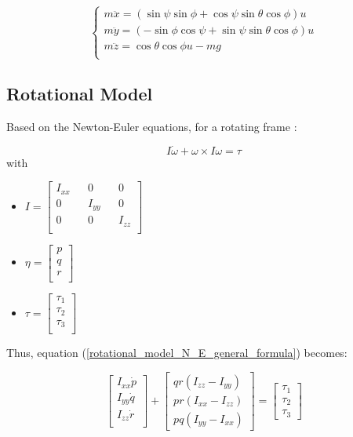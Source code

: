 \documentclass{thesisreport}
\begin{document}
\begin{equation}\label{translation_model_N_E}
\begin{cases}
m \ddot{x} = (\sin \psi \sin \phi + \cos \psi \sin \theta \cos \phi)u \\
m \ddot{y} = (- \sin \phi \cos \psi + \sin \psi \sin \theta \cos \phi )u \\
m \ddot{z} = \cos \theta \cos \phi u -mg \\
\end{cases}
\end{equation}



\subsection*{Rotational Model}

Based on the Newton-Euler equations, for a rotating frame \cite{Murray1994}: 

\begin{equation}\label{rotational_model_N_E_general_formula}
I \dot{\omega} + \omega \times I \omega = \tau
\end{equation}
with

\begin{itemize}
	\item $I = \begin{bmatrix}
	I_{xx} && 0 && 0 \\
	0 && I_{yy} && 0 \\
	0 && 0 && I_{zz} \\
	\end{bmatrix}$
	\item $\eta=\begin{bmatrix}
	p \\
	q \\
	r \\
	\end{bmatrix}$
	\item $\tau = \begin{bmatrix}
	\tau_1 \\
	\tau_2 \\
	\tau_3 \\
	\end{bmatrix}$
\end{itemize}

Thus, equation (\ref{rotational_model_N_E_general_formula}) becomes:

\begin{equation}
\begin{bmatrix}
I_{xx}\dot{p}\\
I_{yy}\dot{q}\\
I_{zz}\dot{r}\\
\end{bmatrix}+ \begin{bmatrix}
qr(I_{zz}-I_{yy})\\
pr(I_{xx}-I_{zz})\\
pq(I_{yy}-I_{xx})
\end{bmatrix} = \begin{bmatrix}
\tau_1 \\
\tau_2 \\
\tau_3
\end{bmatrix}
\end{equation}
\end{document}
